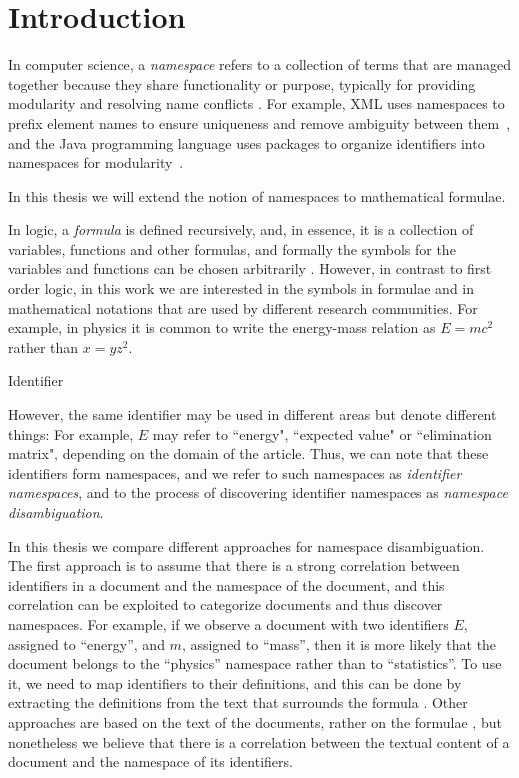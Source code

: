 \section{Introduction}

In computer science, a \emph{namespace} refers to a collection of terms that are managed 
together because they share functionality or purpose, typically for providing modularity 
and resolving name conflicts \cite{duval2002metadata}. For example, XML uses namespaces 
to prefix element names to ensure uniqueness and remove ambiguity between
them~\cite{}, and the Java programming language uses packages to organize
identifiers into namespaces for modularity~\cite{gosling2014java}.

In this thesis we will extend the notion of namespaces to mathematical formulae.


In logic, a \emph{formula} is defined recursively, and, in essence, 
it is a collection of variables, functions and other formulas, and formally the symbols for
the variables and functions can be chosen arbitrarily \cite{barwise2000language}. 
However, in contrast to first order logic, in this work we are interested in the symbols 
in formulae and in mathematical notations that are used by different research communities.
For example, in physics it is common to write the energy-mass relation as $E=mc^2$ rather 
than $x=yz^2$.

Identifier 


However, the same identifier may be used in different areas but denote different things: 
For example, $E$ may refer to ``energy", ``expected value" or ``elimination matrix", depending on
the domain of the article. Thus, we can note that these identifiers form namespaces, and we 
refer to such namespaces as \emph{identifier namespaces}, and to the process of discovering
identifier namespaces as \emph{namespace disambiguation}.


In this thesis we compare different approaches for namespace disambiguation. 
The first approach is to assume that there is a strong correlation between identifiers in 
a document and the namespace of the document, and this correlation can be exploited to 
categorize documents and thus discover namespaces. For example, if we observe a document with 
two identifiers $E$, assigned to ``energy'', and $m$, assigned to ``mass'', then it is more 
likely that the document belongs to the ``physics'' namespace rather than to ``statistics''. 
To use it, we need to map identifiers to their definitions, and this can be done by extracting 
the definitions from the text that surrounds the formula \cite{pagael2014mlp}. Other approaches 
are based on the text of the documents, rather on the formulae \cite{sebastiani2002machine}, 
but nonetheless we believe that there is a correlation between the textual content of a document 
and the namespace of its identifiers.






